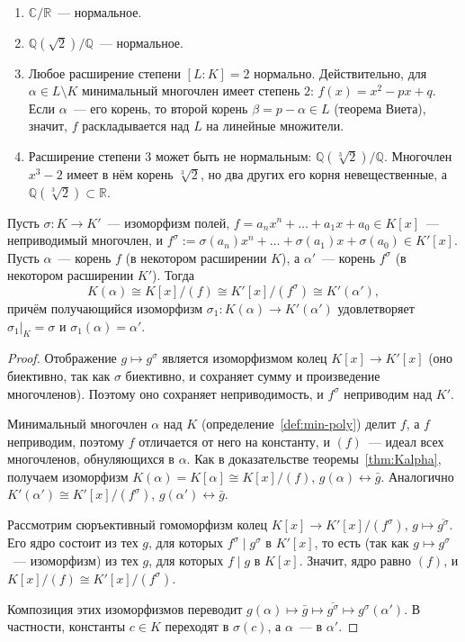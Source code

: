 \documentclass[12pt]{article}
\begin{document}
	\begin{example}
		\begin{enumerate}
			\item $\mathbb{C}/\mathbb{R}$~--- нормальное.
			\item $\mathbb{Q}(\sqrt2)/\mathbb{Q}$~--- нормальное.
			\item Любое расширение степени $[L:K] = 2$ нормально. Действительно, для $\alpha \in L \setminus K$ минимальный многочлен имеет степень $2$: $f(x) = x^2 - px + q$. Если $\alpha$~--- его корень, то второй корень $\beta = p - \alpha \in L$ (теорема Виета), значит, $f$ раскладывается над $L$ на линейные множители.
			\item Расширение степени $3$ может быть не нормальным: $\mathbb{Q}(\sqrt[3]{2})/\mathbb{Q}$. Многочлен $x^3 - 2$ имеет в нём корень $\sqrt[3]{2}$, но два других его корня невещественные, а $\mathbb{Q}(\sqrt[3]{2}) \subset \mathbb{R}$.
		\end{enumerate}
	\end{example}

	\begin{lemma}\label{lem:iso-simple-ext}
		Пусть $\sigma: K \to K'$~--- изоморфизм полей, $f = a_n x^n + \ldots + a_1 x + a_0 \in K[x]$~--- неприводимый многочлен, и $f^\sigma := \sigma(a_n)x^n + \ldots + \sigma(a_1)x + \sigma(a_0) \in K'[x]$. Пусть $\alpha$~--- корень $f$ (в некотором расширении $K$), а $\alpha'$~--- корень $f^\sigma$ (в некотором расширении $K'$). Тогда
		\[
			K(\alpha) \cong K[x]/(f) \cong K'[x]/(f^\sigma) \cong K'(\alpha'),
		\]
		причём получающийся изоморфизм $\sigma_1: K(\alpha) \to K'(\alpha')$ удовлетворяет $\sigma_1|_K = \sigma$ и $\sigma_1(\alpha) = \alpha'$.
	\end{lemma}
	\begin{proof}
		Отображение $g \mapsto g^\sigma$ является изоморфизмом колец $K[x] \to K'[x]$ (оно биективно, так как $\sigma$ биективно, и сохраняет сумму и произведение многочленов). Поэтому оно сохраняет неприводимость, и $f^\sigma$ неприводим над $K'$.

		Минимальный многочлен $\alpha$ над $K$ (определение~\ref{def:min-poly}) делит $f$, а $f$ неприводим, поэтому $f$ отличается от него на константу, и $(f)$~--- идеал всех многочленов, обнуляющихся в $\alpha$. Как в доказательстве теоремы~\ref{thm:Kalpha}, получаем изоморфизм $K(\alpha) = K[\alpha] \cong K[x]/(f)$, $g(\alpha) \leftrightarrow \bar g$. Аналогично $K'(\alpha') \cong K'[x]/(f^\sigma)$, $g(\alpha') \leftrightarrow \bar g$.

		Рассмотрим сюръективный гомоморфизм колец $K[x] \to K'[x]/(f^\sigma)$, $g \mapsto \overline{g^\sigma}$. Его ядро состоит из тех $g$, для которых $f^\sigma \mid g^\sigma$ в $K'[x]$, то есть (так как $g \mapsto g^\sigma$~--- изоморфизм) из тех $g$, для которых $f \mid g$ в $K[x]$. Значит, ядро равно $(f)$, и $K[x]/(f) \cong K'[x]/(f^\sigma)$.

		Композиция этих изоморфизмов переводит $g(\alpha) \mapsto \bar g \mapsto \overline{g^\sigma} \mapsto g^\sigma(\alpha')$. В частности, константы $c \in K$ переходят в $\sigma(c)$, а $\alpha$~--- в $\alpha'$.
	\end{proof}
\end{document}
